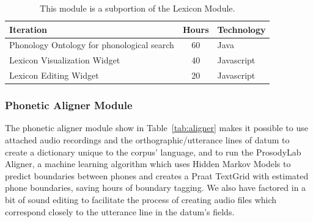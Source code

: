 \documentclass[12pt]{article}
\begin{document}
\begin{table}[htbp]
\begin{center}
  \begin{tabular}{ | lcl | }
\hline
Iteration&  Hours&  Technology  \\
\hline
Phonology Ontology for phonological search& 60& Java  \\ 
Lexicon Visualization Widget& 40& Javascript  \\ 
Lexicon Editing Widget& 20& Javascript  \\ 
\hline
  \end{tabular}
 \caption{This module is a subportion of the Lexicon Module.}
  \label{tab:phono}
  \end{center}
\end{table}


\newpage
\subsubsection{Phonetic Aligner Module}
The phonetic aligner module show in Table~\ref{tab:aligner} makes it possible to use attached audio recordings and the orthographic/utterance lines of datum to create a dictionary unique to the corpus' language, and to run the ProsodyLab Aligner, a machine learning algorithm which uses Hidden Markov Models to predict boundaries between phones and creates a Praat TextGrid with estimated phone boundaries, saving hours of boundary tagging. We also have factored in a bit of sound editing to facilitate the process of creating audio files which correspond closely to the utterance line in the datum's fields. 
\end{document}
